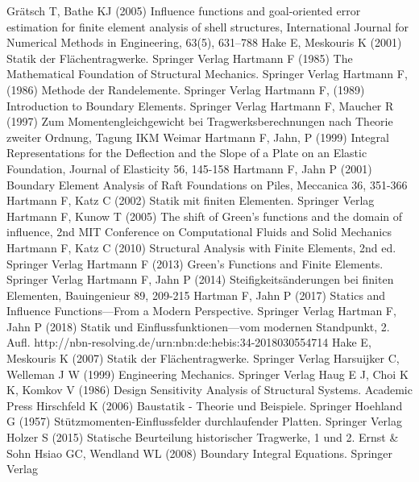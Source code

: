 \begin{thebibliography}{}
 Gr\"{a}tsch T, Bathe KJ (2005) \lqq Influence functions and goal-oriented error estimation for finite element analysis of shell structures\rqq, International Journal for Numerical Methods in Engineering, 63(5), 631--788
 Hake E, Meskouris K (2001) Statik der Fl\"{a}chentragwerke. Springer Verlag
 Hartmann F (1985) The Mathematical Foundation of Structural Mechanics. Springer Verlag
 Hartmann F, (1986) Methode der Randelemente. Springer Verlag
 Hartmann F, (1989) Introduction to Boundary Elements. Springer Verlag
 Hartmann F, Maucher R (1997) \lqq Zum Momentengleichgewicht bei Tragwerksberechnungen nach Theorie zweiter Ordnung\rqq,  Tagung IKM Weimar
 Hartmann F, Jahn, P (1999) \lqq Integral Representations for the Deflection and the Slope of a Plate on an  Elastic Foundation\rqq,  Journal of Elasticity 56, 145-158
 Hartmann F, Jahn P (2001) \lqq Boundary Element Analysis of Raft Foundations on Piles\rqq, Meccanica 36, 351-366
 Hartmann F, Katz C (2002) Statik mit finiten Elementen. Springer Verlag
 Hartmann F, Kunow T (2005) \lqq The shift of Green's functions and the domain of influence\rqq, 2nd MIT Conference on Computational Fluids and Solid Mechanics
 Hartmann F, Katz C (2010) Structural Analysis with Finite Elements, 2nd ed. Springer Verlag
 Hartmann F (2013) Green's Functions and Finite Elements. Springer Verlag
 Hartmann F, Jahn P (2014) \lqq Steifigkeits\"{a}nderungen bei finiten Elementen\rqq, Bau\-ingenieur 89, 209-215
 Hartman F, Jahn P (2017) Statics and Influence Functions---From a Modern Perspective. Springer Verlag
 Hartman F, Jahn P (2018) Statik und Einflussfunktionen---vom modernen Standpunkt, 2. Aufl. http://nbn-resolving.de/urn:nbn:de:hebis:34-2018030554714
 Hake E, Meskouris K (2007) Statik der Fl\"{a}chentragwerke. Springer Verlag
 Harsuijker C, Welleman J W (1999) Engineering Mechanics. Springer Verlag
 Haug E J, Choi K K, Komkov V (1986) Design Sensitivity Analysis of Structural Systems. Academic Press
 Hirschfeld K (2006) Baustatik - Theorie und Beispiele. Springer
 Hoehland G (1957) St\"{u}tzmomenten-Einflussfelder durchlaufender Platten. Springer Verlag
 Holzer S (2015) Statische Beurteilung historischer Tragwerke, 1 und 2. Ernst \& Sohn
 Hsiao GC, Wendland WL (2008) Boundary Integral Equations. Springer Verlag

\end{thebibliography}

